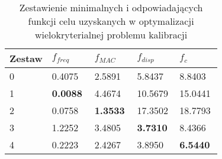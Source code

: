 \begin{table}[t!]
	\caption{Zestawienie minimalnych i odpowiadających funkcji celu uzyskanych w optymalizacji wielokryterialnej problemu kalibracji}
	\centering
	\footnotesize
	\setlength\tabcolsep{0pt}
	\begin{tabular}{@{}P{0.2\linewidth} *4{P{0.2\linewidth}}@{}}	
		\toprule
		Zestaw & $f_{freq}$ & $f_{MAC}$ & $f_{disp}$ & $f_{c}$ \\  & 0.4075			& 2.5891		  & 5.8437		   & 8.8403			\\ %
		1 & \textbf{0.0088} & 4.4674          & 10.5679        & 15.0441           \\ %
		2 & 0.0758          & \textbf{1.3533} & 17.3502        & 18.7793       \\ %
		3 & 1.2252          & 3.4805          & \textbf{3.7310} & 8.4366           \\ %
		4 & 0.2223          & 2.4267          & 3.8950         & \textbf{6.5440}  \\ \bottomrule
	\end{tabular}
	\label{tab:minimal_values_calibration}
\end{table}


